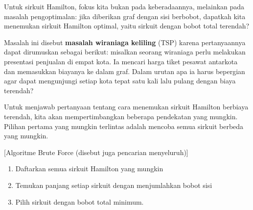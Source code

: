 Untuk sirkuit Hamilton, fokus kita bukan pada keberadaannya, melainkan pada masalah pengoptimalan: jika diberikan graf dengan sisi berbobot, dapatkah kita menemukan sirkuit Hamilton optimal, yaitu sirkuit dengan bobot total terendah?\\
\begin{minipage}{0.5\textwidth}
Masalah ini disebut \textbf{masalah wiraniaga keliling} (TSP) karena pertanyaannya dapat dirumuskan sebagai berikut: misalkan seorang wiraniaga perlu melakukan presentasi penjualan di empat kota.  Ia mencari harga tiket pesawat antarkota dan memasukkan biayanya ke dalam graf.  Dalam urutan apa ia harus bepergian agar dapat mengunjungi setiap kota tepat satu kali lalu pulang dengan biaya terendah? 
\end{minipage}
%
\begin{minipage}{0.5\textwidth}
\end{minipage}

Untuk menjawab pertanyaan tentang cara menemukan sirkuit Hamilton berbiaya terendah, kita akan mempertimbangkan beberapa pendekatan yang mungkin.  Pilihan pertama yang mungkin terlintas adalah mencoba semua sirkuit berbeda yang mungkin.

\begin{algorithm}{}{}[Algoritme Brute Force (disebut juga pencarian menyeluruh)]
\hspace{3in}
\begin{enumerate}
\item	Daftarkan semua sirkuit Hamilton yang mungkin
\item	Temukan panjang setiap sirkuit dengan menjumlahkan bobot sisi
\item	Pilih sirkuit dengan bobot total minimum.
\end{enumerate}
\end{algorithm}


